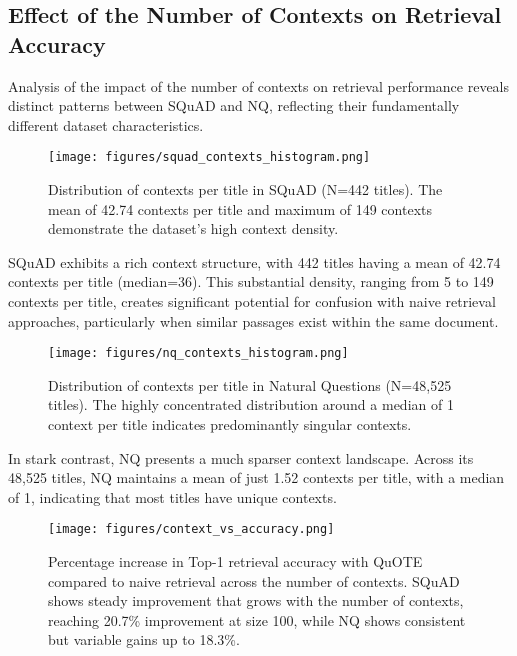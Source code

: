 \iffalse
\noindent\textbf{Conclusion.} 
Although large-scale models like GPT-4 consistently achieve slightly higher Top-1 Context Accuracy, 
smaller models (\emph{e.g.}, LLaMA variants around 3B--9B parameters) remain competitive, especially 
once $k$ surpasses 5. These results suggest that \emph{cheaper} LLMs can feasibly serve as a 
question-generation engine without drastically sacrificing accuracy in RAG workflows.
\fi



\subsection{Effect of the Number of Contexts on Retrieval Accuracy}
\label{subsec:context-vs-accuracy}

Analysis of the impact of the number of contexts on retrieval performance reveals distinct patterns between SQuAD and NQ, reflecting their fundamentally different dataset characteristics.

\begin{figure}[ht]
\centering
\texttt{[image: figures/squad\_contexts\_histogram.png]}
\caption{Distribution of contexts per title in SQuAD (N=442 titles). The mean of 42.74 contexts per title and maximum of 149 contexts demonstrate the dataset's high context density.}
\label{fig:squad_distribution}
\end{figure}

SQuAD exhibits a rich context structure, with 442 titles having a mean of 42.74 contexts per title (median=36). This substantial density, ranging from 5 to 149 contexts per title, creates significant potential for confusion with naive retrieval approaches, particularly when similar passages exist within the same document.

\begin{figure}[ht]
\centering
\texttt{[image: figures/nq\_contexts\_histogram.png]}
\caption{Distribution of contexts per title in Natural Questions (N=48,525 titles). The highly concentrated distribution around a median of 1 context per title indicates predominantly singular contexts.}
\label{fig:nq_distribution}
\end{figure}

In stark contrast, NQ presents a much sparser context landscape. Across its 48,525 titles, NQ maintains a mean of just 1.52 contexts per title, with a median of 1, indicating that most titles have unique contexts.

\begin{figure}[ht]
\centering
\texttt{[image: figures/context\_vs\_accuracy.png]}
\caption{Percentage increase in Top-1 retrieval accuracy with QuOTE compared to naive retrieval across the number of contexts. SQuAD shows steady improvement that grows with the number of contexts, reaching 20.7\% improvement at size 100, while NQ shows consistent but variable gains up to 18.3\%.}
\label{fig:improvement}
\end{figure}

